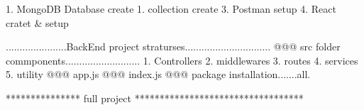 1. MongoDB Database create 
1. collection create 
3. Postman setup
4. React cratet & setup

......................BackEnd project straturses...............................
 @@@ src folder commponents...........................
   1. Controllers
   2. middlewares
   3. routes
   4. services
   5. utility
@@@ app.js
@@@ index.js
@@@ package installation.......all.

*************** full project **********************************
